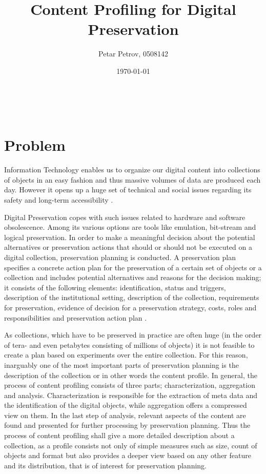 \documentclass[a4paper,12pt]{scrartcl} %
\title{Content Profiling for Digital Preservation}
\author{Petar Petrov, 0508142}
\date{\today}
\makeatletter
\renewcommand{\maketitle}{\begingroup
    \let\footnotesize\small
    \let\footnoterule\relax
    \parindent \z@
    \reset@font
    \vskip 1\p@
    \begin{flushleft}
      \LARGE
      \strut\@title
    \end{flushleft}
    \@author \\
    \@date
    \vskip 40\p@
  \endgroup
  \setcounter{footnote}{0}%
}
\makeatother
\begin{document}
\maketitle

\section*{Problem}
Information Technology enables us to organize our digital content into collections of objects in an easy fashion and thus massive volumes of data are produced each day.
However it opens up a huge set of technical and social issues regarding its safety and long-term accessibility \cite{Lorie:2001:LTP:379437.379726}.

Digital Preservation copes with such issues related to hardware and software obsolescence. Among its various
options are tools like emulation, bit-stream and logical preservation. In order to make a meaningful decision
about the potential alternatives or preservation actions that should or should not be executed on a
digital collection, preservation planning is conducted. A preservation plan specifies a concrete action plan for the preservation
of a certain set of objects or a collection and includes potential alternatives and reasons for the decision making; it
consists of the following elements: identification, status and triggers, description of the institutional setting, description of the collection, requirements for preservation, evidence of decision for a preservation strategy, costs, roles and responsibilities and preservation action plan \cite{Becker:2009fk}. 

As collections, which have to be preserved in practice are often huge (in the order of tera- and even petabytes consisting of millions of objects) it is not feasible to create a plan based on experiments over the entire collection. For this reason, inarguably one of the most important parts of preservation planning is the description of the collection or in other words the content profile. In general, the process of content profiling consists of three parts; characterization, aggregation and analysis. Characterization is responsible for the extraction of meta data and the identification of the digital objects, while aggregation offers a compressed view on them. In the last step of analysis, relevant aspects of the content are found and presented for further processing by preservation planning. Thus the process of content profiling shall give a more detailed description about a collection, as a profile consists not only of simple measures such as size, count of objects and format but also provides a deeper view based on any other feature and its distribution, that is of interest for preservation planning.
\end{document}
